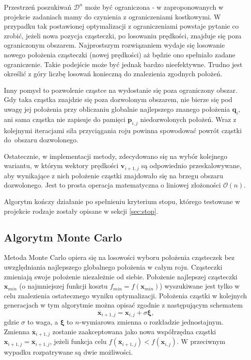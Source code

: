 \documentclass[11pt, a4paper, oneside]{article}
\newcommand{\vect}[1]{\bm{\mathbf{#1}}}
\begin{document}
Przestrzeń poszukiwań $\mathcal{D}^{n}$ może być ograniczona - w zaproponowanych w projekcie zadaniach mamy do czynienia z ograniczeniami kostkowymi. W przypadku tak postawionej optymalizacji z ograniczeniami powstaje pytanie co zrobić, jeżeli nowa pozycja cząsteczki, po losowaniu prędkości, znajduje się poza ograniczonym obszarem. Najprostszym rozwiązaniem wydaje się losowanie nowego położenia cząsteczki (nowej prędkości) aż będzie ono spełniało zadane ograniczenie. Takie podejście może być jednak bardzo nieefektywne. Trudno jest określić z góry liczbę losowań konieczną do znalezienia zgodnych położeń.

Inny pomysł to pozwolenie cząstce na wydostanie się poza ograniczony obszar. Gdy taka cząstka znajdzie się poza dozwolonym obszarem, nie bierze się pod uwagę jej położenia przy obliczaniu globalnie najlepszego znanego położenia $\vect{q}_{i}$, ani sama cząstka nie zapisuje do pamięci $\vect{p}_{i, j}$ niedozwolonych położeń. Wraz z kolejnymi iteracjami siła przyciągania roju powinna spowodować powrót cząstki do~obszaru dozwolonego.

Ostatecznie, w implementacji metody, zdecydowano się na wybór kolejnego wariantu, w którym wektory prędkości $\vect{v}_{i + 1, j}$ są odpowiednio przeskalowywane, aby wynikające z nich położenie cząstki znajdowało się na brzegu obszaru dozwolonego. Jest to prosta operacja matematyczna o liniowej złożoności $\mathcal{O}\left(n\right)$.

Algorytm kończy działanie po spełnieniu kryterium stopu, którego testowane w projekcie rodzaje zostały opisane w sekcji \ref{sec:stop}.

\subsection{Algorytm Monte Carlo} 

Metoda Monte Carlo opiera się na losowości wyboru położenia cząsteczek bez uwzględniania najlepszego globalnego położenia w całym roju. Cząsteczki zmieniają swoje położenie niezależnie od siebie. Położenie najlepszej cząsteczki $\vect{x}_{min}$ (o najmniejszej funkcji kosztu $f_{min} = f\left(\vect{x}_{min}\right)$) wyszukiwane jest tylko w celu znalezienia ostatecznego wyniku optymalizacji. Położenia cząstki w kolejnych generacjach w tym algorytmie można opisać zgodnie z następującym schematem
\begin{equation}
\vect{\overline{x}}_{i + 1, j} = \vect{x}_{i, j} + \sigma\vect{\xi},
\end{equation}
gdzie $\sigma$ to waga, a $\vect{\xi}$ to $n$-wymiarowa zmienna o rozkładzie jednostajnym. Zmienna $\vect{\overline{x}}_{i + 1, j}$ zostanie zaakceptowana jako nowa współrzędna cząstki $\vect{x}_{i + 1, j} = \vect{\overline{x}}_{i + 1, j}$, jeżeli funkcja celu $f\left(\vect{\overline{x}}_{i + 1, j}\right) < f\left(\vect{x}_{i, j}\right)$. W przeciwnym wypadku rozpatrywane są dwie możliwości.
\end{document}

